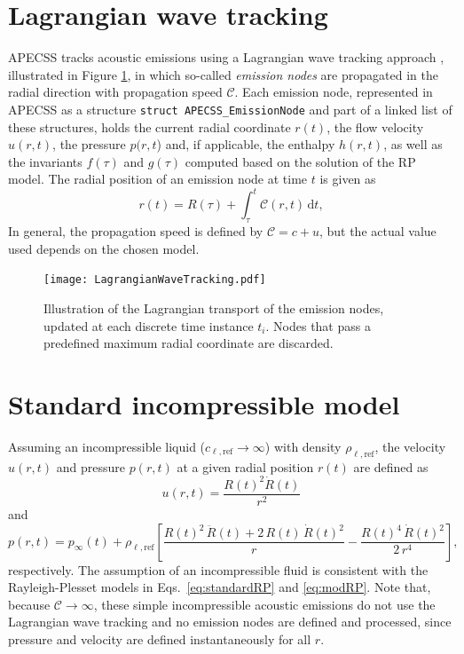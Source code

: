 \section{Lagrangian wave tracking}

APECSS tracks acoustic emissions using a Lagrangian wave tracking approach \citep{Denner2023}, illustrated in Figure \ref{fig:lagrangiantracking}, in which so-called \textit{emission nodes} are propagated in the radial direction with propagation speed $\mathcal{C}$. Each emission node, represented in APECSS as a structure {\tt struct APECSS\_EmissionNode} and part of a linked list of these structures, holds the current radial coordinate $r(t)$, the flow velocity $u(r,t)$, the pressure $p(r,t$) and, if applicable, the enthalpy $h(r,t)$, as well as the invariants $f(\tau)$ and $g(\tau)$ computed based on the solution of the RP model. The radial position of an emission node at time $t$ is given as
\begin{equation}
    r(t) = R(\tau) + \int_\tau^t \mathcal{C}(r,t) \, \mathrm{d}t, 
    \label{eq:r_t}
\end{equation}
In general, the propagation speed is defined by $\mathcal{C}=c+u$, but the actual value used depends on the chosen model.

\begin{figure}
    \begin{center}
    \texttt{[image: LagrangianWaveTracking.pdf]}
    \caption{Illustration of the Lagrangian transport of the emission nodes, updated at each discrete time instance $t_i$. Nodes that pass a predefined maximum radial coordinate are discarded.}
    \label{fig:lagrangiantracking}
    \end{center}
\end{figure}

\section{Standard incompressible model}
\label{sec:emissionsic}

Assuming an incompressible liquid ($c_{\ell,\mathrm{ref}} \rightarrow  \infty$) with density $\rho_{\ell,\mathrm{ref}}$, the velocity $u(r,t)$ and pressure $p(r,t)$ at a given radial position $r(t)$ are defined as \citep{Neppiras1980}
\begin{equation}
    u(r,t) = \frac{R(t)^2 \dot{R}(t)}{r^2}  \label{eq:u_rt_incomp} 
\end{equation}
and 
\begin{equation}
    p(r,t) = p_\infty(t) + \rho_{\ell,\mathrm{ref}} \left[\frac{R(t)^2 \, \ddot{R}(t) + 2 \, R(t) \, \dot{R}(t)^2}{r} - \frac{R(t)^4 \, \dot{R}(t)^2}{2 \, r^4} \right], \label{eq:p_rt_incomp}
\end{equation}
respectively. The assumption of an incompressible fluid is consistent with the Rayleigh-Plesset models in Eqs.~\eqref{eq:standardRP} and \eqref{eq:modRP}. Note that, because $\mathcal{C} \rightarrow \infty$, these simple incompressible acoustic emissions do not use the Lagrangian wave tracking and no emission nodes are defined and processed, since pressure and velocity are defined instantaneously for all $r$.

